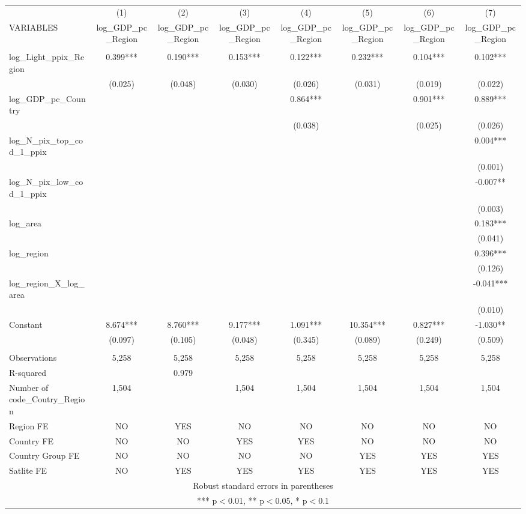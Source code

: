 \begin{tabular}{lccccccc} \hline
 & (1) & (2) & (3) & (4) & (5) & (6) & (7) \\
VARIABLES & log\_GDP\_pc\_Region & log\_GDP\_pc\_Region & log\_GDP\_pc\_Region & log\_GDP\_pc\_Region & log\_GDP\_pc\_Region & log\_GDP\_pc\_Region & log\_GDP\_pc\_Region \\ \hline
 &  &  &  &  &  &  &  \\
log\_Light\_ppix\_Region & 0.399*** & 0.190*** & 0.153*** & 0.122*** & 0.232*** & 0.104*** & 0.102*** \\
 & (0.025) & (0.048) & (0.030) & (0.026) & (0.031) & (0.019) & (0.022) \\
log\_GDP\_pc\_Country &  &  &  & 0.864*** &  & 0.901*** & 0.889*** \\
 &  &  &  & (0.038) &  & (0.025) & (0.026) \\
log\_N\_pix\_top\_cod\_1\_ppix &  &  &  &  &  &  & 0.004*** \\
 &  &  &  &  &  &  & (0.001) \\
log\_N\_pix\_low\_cod\_1\_ppix &  &  &  &  &  &  & -0.007** \\
 &  &  &  &  &  &  & (0.003) \\
log\_area &  &  &  &  &  &  & 0.183*** \\
 &  &  &  &  &  &  & (0.041) \\
log\_region &  &  &  &  &  &  & 0.396*** \\
 &  &  &  &  &  &  & (0.126) \\
log\_region\_X\_log\_area &  &  &  &  &  &  & -0.041*** \\
 &  &  &  &  &  &  & (0.010) \\
Constant & 8.674*** & 8.760*** & 9.177*** & 1.091*** & 10.354*** & 0.827*** & -1.030** \\
 & (0.097) & (0.105) & (0.048) & (0.345) & (0.089) & (0.249) & (0.509) \\
 &  &  &  &  &  &  &  \\
Observations & 5,258 & 5,258 & 5,258 & 5,258 & 5,258 & 5,258 & 5,258 \\
R-squared &  & 0.979 &  &  &  &  &  \\
Number of code\_Coutry\_Region & 1,504 &  & 1,504 & 1,504 & 1,504 & 1,504 & 1,504 \\
Region FE & NO & YES & NO & NO & NO & NO & NO \\
Country FE & NO & NO & YES & YES & NO & NO & NO \\
Country Group FE & NO & NO & NO & NO & YES & YES & YES \\
 Satlite FE & NO & YES & YES & YES & YES & YES & YES \\ \hline
\multicolumn{8}{c}{ Robust standard errors in parentheses} \\
\multicolumn{8}{c}{ *** p$<$0.01, ** p$<$0.05, * p$<$0.1} \\
\end{tabular}
